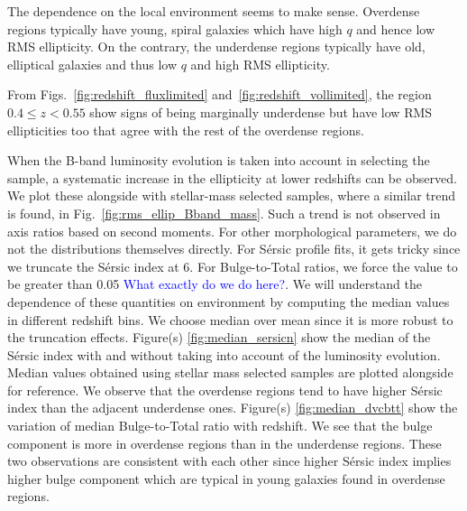 \documentclass[twocolumn,useAMS,usenatbib]{mn2e}
\newcommand{\arun}[1]{{\textcolor{blue}{#1}}}
\newcommand{\sersic}{S\'{e}rsic }
\newcommand{\btt}{Bulge-to-Total }
\begin{document}
The dependence on the local environment seems to make sense. Overdense regions typically have young, spiral galaxies which have high $q$ and hence low RMS ellipticity. 
On the contrary, the underdense regions typically have old, elliptical galaxies and thus low $q$ and high RMS ellipticity.

From Figs.~\ref{fig:redshift_fluxlimited} and~\ref{fig:redshift_vollimited},
the region $0.4\le z < 0.55$ show signs of being marginally underdense but have low RMS ellipticities too that agree with the rest of the overdense regions.

When the B-band luminosity evolution is taken into account in selecting the sample, a systematic increase in the ellipticity at lower redshifts can be observed. We plot these alongside with stellar-mass selected samples, where a similar trend is found, in Fig.~\ref{fig:rms_ellip_Bband_mass}. 
Such a trend is not observed in axis ratios based on second moments. 
For other morphological parameters, we do not the distributions themselves directly. For \sersic profile fits, it gets tricky since we truncate the \sersic index at 6. 
For \btt ratios, we force the value to be greater than 0.05 \arun{What exactly do we do here?}. We will understand the dependence of these quantities on environment by computing the median values in different redshift bins.
We choose median over mean since it is more robust to the truncation effects.
Figure(s) \ref{fig:median_sersicn} show the median of the \sersic index with and without taking into account of the luminosity evolution. Median values obtained using stellar mass selected samples are plotted alongside for reference.
We observe that the overdense regions tend to have higher \sersic index than the adjacent underdense ones.
Figure(s) \ref{fig:median_dvcbtt} show the variation of median \btt ratio with redshift. We see that the bulge component is more in overdense regions than in the underdense regions.
These two observations are consistent with each other since higher \sersic index implies higher bulge component which are typical in young galaxies found in overdense regions.
\end{document}
